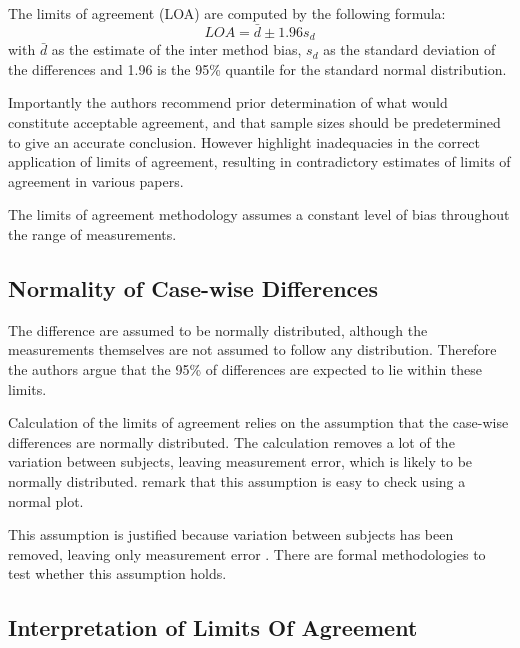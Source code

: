 \documentclass[12pt, a4paper]{report}
\theoremstyle{plain}
\theoremstyle{definition}
\theoremstyle{remark}
\begin{document}
The limits of agreement (LOA) are computed by the following
formula:
\[
LOA = \bar{d} \pm 1.96 s_{d}
\]
with $\bar{d}$ as the estimate of the inter method bias, $s_{d}$
as the standard deviation of the differences and 1.96 is the 95\%
quantile for the standard normal distribution. 

Importantly the authors recommend prior determination of what would constitute acceptable agreement, and that sample sizes should be predetermined to give an accurate conclusion. However \citet{mantha} highlight inadequacies in the correct application of limits of agreement, resulting in contradictory estimates of limits of agreement in various papers.

The limits of agreement methodology assumes a constant level of bias throughout the range of measurements. 






\subsection{Normality of Case-wise Differences}	
The difference are assumed to be normally distributed, although the measurements themselves are not assumed to follow any distribution. Therefore the authors argue that the 95\% of differences are expected to lie within these limits. 

Calculation of the limits of agreement relies on the assumption that the case-wise differences are normally distributed.
The calculation removes a lot of the variation between subjects,  leaving measurement error, which is likely to be normally distributed. \citet{BA99} remark that this assumption is easy to check using a normal plot. 


This assumption is justified because variation between subjects has been removed, leaving only measurement error \citep{BA86}. There are formal methodologies to test whether this assumption holds.






\subsection{Interpretation of Limits Of Agreement}
\end{document}
